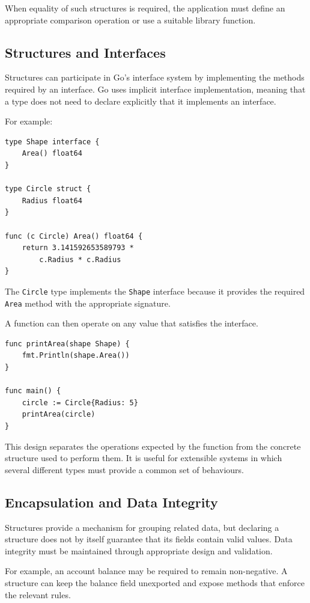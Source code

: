 When equality of such structures is required, the application must define an appropriate comparison operation or use a suitable library function.

\subsection{Structures and Interfaces}

Structures can participate in Go's interface system by implementing the methods required by an interface. Go uses implicit interface implementation, meaning that a type does not need to declare explicitly that it implements an interface.

For example:

\begin{lstlisting}
type Shape interface {
    Area() float64
}

type Circle struct {
    Radius float64
}

func (c Circle) Area() float64 {
    return 3.141592653589793 *
        c.Radius * c.Radius
}
\end{lstlisting}

The \texttt{Circle} type implements the \texttt{Shape} interface because it provides the required \texttt{Area} method with the appropriate signature.

A function can then operate on any value that satisfies the interface.

\begin{lstlisting}
func printArea(shape Shape) {
    fmt.Println(shape.Area())
}

func main() {
    circle := Circle{Radius: 5}
    printArea(circle)
}
\end{lstlisting}

This design separates the operations expected by the function from the concrete structure used to perform them. It is useful for extensible systems in which several different types must provide a common set of behaviours.

\subsection{Encapsulation and Data Integrity}

Structures provide a mechanism for grouping related data, but declaring a structure does not by itself guarantee that its fields contain valid values. Data integrity must be maintained through appropriate design and validation.

For example, an account balance may be required to remain non-negative. A structure can keep the balance field unexported and expose methods that enforce the relevant rules.

